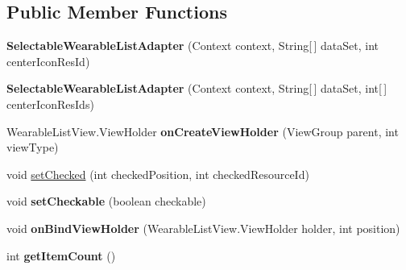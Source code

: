 \subsection*{Public Member Functions}
\begin{DoxyCompactItemize}
\item 
{\bfseries Selectable\+Wearable\+List\+Adapter} (Context context, String\mbox{[}$\,$\mbox{]} data\+Set, int center\+Icon\+Res\+Id)\hypertarget{classcom_1_1google_1_1devrel_1_1wcl_1_1widgets_1_1list_1_1SelectableWearableListAdapter_a6ce54e08ae82b972f72aabe92613aa0d}{}\label{classcom_1_1google_1_1devrel_1_1wcl_1_1widgets_1_1list_1_1SelectableWearableListAdapter_a6ce54e08ae82b972f72aabe92613aa0d}

\item 
{\bfseries Selectable\+Wearable\+List\+Adapter} (Context context, String\mbox{[}$\,$\mbox{]} data\+Set, int\mbox{[}$\,$\mbox{]} center\+Icon\+Res\+Ids)\hypertarget{classcom_1_1google_1_1devrel_1_1wcl_1_1widgets_1_1list_1_1SelectableWearableListAdapter_aaae73398168b503a553c3ec476f494a4}{}\label{classcom_1_1google_1_1devrel_1_1wcl_1_1widgets_1_1list_1_1SelectableWearableListAdapter_aaae73398168b503a553c3ec476f494a4}

\item 
Wearable\+List\+View.\+View\+Holder {\bfseries on\+Create\+View\+Holder} (View\+Group parent, int view\+Type)\hypertarget{classcom_1_1google_1_1devrel_1_1wcl_1_1widgets_1_1list_1_1SelectableWearableListAdapter_a071188fa471ce08116b26bfb0c00d204}{}\label{classcom_1_1google_1_1devrel_1_1wcl_1_1widgets_1_1list_1_1SelectableWearableListAdapter_a071188fa471ce08116b26bfb0c00d204}

\item 
void \hyperlink{classcom_1_1google_1_1devrel_1_1wcl_1_1widgets_1_1list_1_1SelectableWearableListAdapter_a8b47c5e515a0b5589241612e9d3ede5e}{set\+Checked} (int checked\+Position, int checked\+Resource\+Id)
\item 
void {\bfseries set\+Checkable} (boolean checkable)\hypertarget{classcom_1_1google_1_1devrel_1_1wcl_1_1widgets_1_1list_1_1SelectableWearableListAdapter_a1266fd6198c44fa7cb896bd194dba334}{}\label{classcom_1_1google_1_1devrel_1_1wcl_1_1widgets_1_1list_1_1SelectableWearableListAdapter_a1266fd6198c44fa7cb896bd194dba334}

\item 
void {\bfseries on\+Bind\+View\+Holder} (Wearable\+List\+View.\+View\+Holder holder, int position)\hypertarget{classcom_1_1google_1_1devrel_1_1wcl_1_1widgets_1_1list_1_1SelectableWearableListAdapter_a1fed6a167ff691aa042aabafea99ff47}{}\label{classcom_1_1google_1_1devrel_1_1wcl_1_1widgets_1_1list_1_1SelectableWearableListAdapter_a1fed6a167ff691aa042aabafea99ff47}

\item 
int {\bfseries get\+Item\+Count} ()\hypertarget{classcom_1_1google_1_1devrel_1_1wcl_1_1widgets_1_1list_1_1SelectableWearableListAdapter_a64686d5cb2391fef1312a44d6f716256}{}\label{classcom_1_1google_1_1devrel_1_1wcl_1_1widgets_1_1list_1_1SelectableWearableListAdapter_a64686d5cb2391fef1312a44d6f716256}

\end{DoxyCompactItemize}


